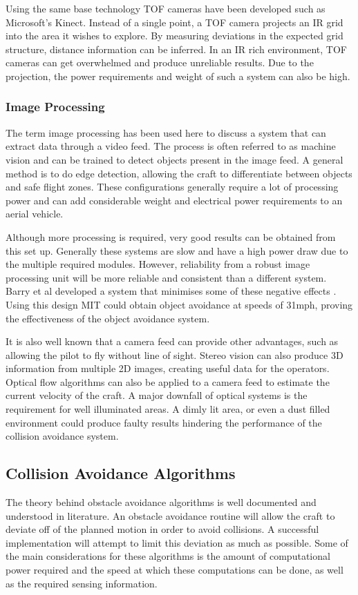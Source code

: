 		Using the same base technology TOF cameras have been developed such as Microsoft's Kinect. Instead of a single point, a TOF camera projects an IR grid into the area it wishes to explore. By measuring deviations in the expected grid structure, distance information can be inferred. In an IR rich environment, TOF cameras can get overwhelmed and produce unreliable results. Due to the projection, the power requirements and weight of such a system can also be high.
	
		\subsubsection{Image Processing}
		The term image processing has been used here to discuss a system that can extract data through a video feed. The process is often referred to as machine vision and can be trained to detect objects present in the image feed. A general method is to do edge detection, allowing the craft to differentiate between objects and safe flight zones. These configurations generally require a lot of processing power and can add considerable weight and electrical power requirements to an aerial vehicle.
		
		Although more processing is required, very good results can be obtained from this set up. Generally these systems are slow and have a high power draw due to the multiple required modules. However, reliability from a robust image processing unit will be more reliable and consistent than a different system. Barry et al developed a system that minimises some of these negative effects \cite{Barry2015}. Using this design MIT could obtain object avoidance at speeds of 31mph, proving the effectiveness of the object avoidance system.
		
		It is also well known that a camera feed can provide other advantages, such as allowing the pilot to fly without line of sight. Stereo vision can also produce 3D information from multiple 2D images, creating useful data for the operators. Optical flow algorithms can also be applied to a camera feed to estimate the current velocity of the craft. A major downfall of optical systems is the requirement for well illuminated areas. A dimly lit area, or even a dust filled environment could produce faulty results hindering the performance of the collision avoidance system.
		
	\subsection{Collision Avoidance Algorithms}\label{ObAvoidLit}
	The theory behind obstacle avoidance algorithms is well documented and understood in literature. An obstacle avoidance routine will allow the craft to deviate off of the planned motion in order to avoid collisions. A successful implementation will attempt to limit this deviation as much as possible. Some of the main considerations for these algorithms is the amount of computational power required and the speed at which these computations can be done, as well as the required sensing information.
	
